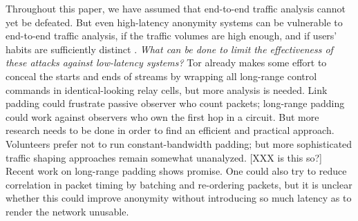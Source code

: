 \documentclass[times,10pt,twocolumn]{article}
\begin{document}
%

Throughout this paper, we have assumed that end-to-end traffic
analysis cannot yet be defeated.  But even high-latency anonymity
systems can be vulnerable to end-to-end traffic analysis, if the
traffic volumes are high enough, and if users' habits are sufficiently
distinct \cite{disclosure,statistical-disclosure}.  \emph{What can be
  done to limit the effectiveness of these attacks against low-latency
  systems?}  Tor already makes some effort to conceal the starts and
ends of streams by wrapping all long-range control commands in
identical-looking relay cells, but more analysis is needed.  Link
padding could frustrate passive observer who count packets; long-range
padding could work against observers who own the first hop in a
circuit.  But more research needs to be done in order to find an
efficient and practical approach.  Volunteers prefer not to run
constant-bandwidth padding; but more sophisticated traffic shaping
approaches remain somewhat unanalyzed. [XXX is this so?] Recent work
on long-range padding \cite{long-range-padding} shows promise.  One
could also try to reduce correlation in packet timing by batching and
re-ordering packets, but it is unclear whether this could improve
anonymity without introducing so much latency as to render the
network unusable.
\end{document}
